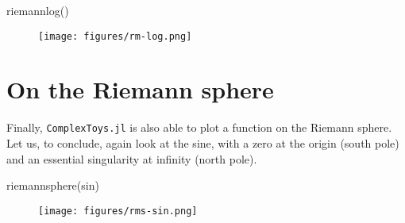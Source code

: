 \documentclass[a4paper]{article}
\begin{document}
\begin{juliaverbatim}
	riemannlog()
\end{juliaverbatim}
\begin{figure}[H]
	\centering
	\texttt{[image: figures/rm-log.png]}
\end{figure}

\section{On the Riemann sphere}

Finally, \texttt{ComplexToys.jl} is also able to plot a function on the Riemann
sphere.  Let us, to conclude, again look at the sine, with a zero at the origin
(south pole) and an essential singularity at infinity (north pole).

\begin{juliaverbatim}
	riemannsphere(sin)
\end{juliaverbatim}
\begin{figure}[H]
	\centering
	\texttt{[image: figures/rms-sin.png]}
\end{figure}
\end{document}
